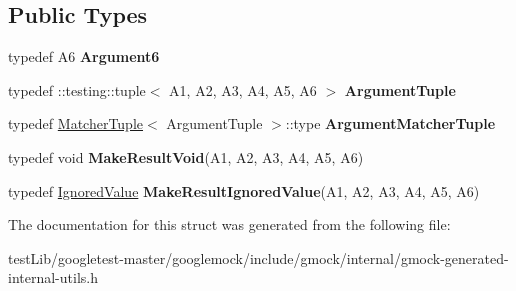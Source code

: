 \subsection*{Public Types}
\begin{DoxyCompactItemize}
\item 
\mbox{\label{structtesting_1_1internal_1_1Function_3_01R_07A1_00_01A2_00_01A3_00_01A4_00_01A5_00_01A6_08_4_ab69a06609b76f3b0ef780b9ecf0a940c}} 
typedef A6 {\bfseries Argument6}
\item 
\mbox{\label{structtesting_1_1internal_1_1Function_3_01R_07A1_00_01A2_00_01A3_00_01A4_00_01A5_00_01A6_08_4_a3120b03652156e1475ce5892e1b5dd7a}} 
typedef \+::testing\+::tuple$<$ A1, A2, A3, A4, A5, A6 $>$ {\bfseries Argument\+Tuple}
\item 
\mbox{\label{structtesting_1_1internal_1_1Function_3_01R_07A1_00_01A2_00_01A3_00_01A4_00_01A5_00_01A6_08_4_a8555cb8e68c1e64b91b6c50a7b5951bd}} 
typedef \hyperlink{structtesting_1_1internal_1_1MatcherTuple}{Matcher\+Tuple}$<$ Argument\+Tuple $>$\+::type {\bfseries Argument\+Matcher\+Tuple}
\item 
\mbox{\label{structtesting_1_1internal_1_1Function_3_01R_07A1_00_01A2_00_01A3_00_01A4_00_01A5_00_01A6_08_4_aa60c44ec945ca78297aaf7a3c785bce5}} 
typedef void {\bfseries Make\+Result\+Void}(A1, A2, A3, A4, A5, A6)
\item 
\mbox{\label{structtesting_1_1internal_1_1Function_3_01R_07A1_00_01A2_00_01A3_00_01A4_00_01A5_00_01A6_08_4_a20c49ac827433a288921ca0caa0d319b}} 
typedef \hyperlink{classtesting_1_1internal_1_1IgnoredValue}{Ignored\+Value} {\bfseries Make\+Result\+Ignored\+Value}(A1, A2, A3, A4, A5, A6)
\end{DoxyCompactItemize}


The documentation for this struct was generated from the following file\+:\begin{DoxyCompactItemize}
\item 
test\+Lib/googletest-\/master/googlemock/include/gmock/internal/gmock-\/generated-\/internal-\/utils.\+h\end{DoxyCompactItemize}
